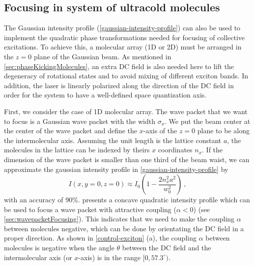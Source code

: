 \subsection{Focusing in system of ultracold molecules}
\label{sec:focusingMolecules}
The Gaussian intensity profile (\ref{gaussian-intensity-profile}) can also be used  to implement the quadratic phase 
transformations needed for focusing of collective excitations. 
To achieve this, a molecular array (1D or 2D) must be arranged in the $z=0$ plane of the Gaussian beam. As
 mentioned in \autoref{sec:phaseKickingMolecules}, an extra  DC field is also needed here to lift the degeneracy of 
rotational states and to avoid mixing of different exciton bands.  In addition, the laser is linearly polarized along the
 direction of the DC field in order for the system to have a well-defined space quantization axis. 


First, we consider the case of 1D molecular array. The wave packet that we want to focus is a Gaussian wave packet
with the width $\sigma_x$. 
We put  the beam center at the center of the wave packet and define the $x$-axis of the $z=0$ plane to be along the intermolecular 
axis. Assuming the unit length is the lattice constant $a$, the molecules in the lattice
can be indexed by theirs $x$ coordinates $n_x$. 
If the dimension of the wave packet is smaller than one third of the
beam waist, we can approximate the gaussian intensity profile in
\autoref{gaussian-intensity-profile} by
\begin{equation}
I(x, y=0, z=0) \approx I_{0}\left(1- \frac{2 n_x^2 a^2}{w_0^2}\right) \ ,  \label{quadratic-profile-1D}
\end{equation}
with an accuracy of 90\%.  presents a concave quadratic intensity
profile which can be used to focus a wave packet with attractive
coupling ($\alpha < 0$) (see \autoref{sec:wavepacketFocusing}). This indicates that we need to make the coupling $\alpha$ between molecules negative, which can be
done by orientating the DC field in a proper direction. 
As shown in \autoref{control-exciton} (a), the coupling $\alpha$ between
molecules is negative when the angle $\theta$ between the DC field and the intermolecular axis (or $x$-axis) is in 
the range $[0, 57.3^{\circ})$. 


